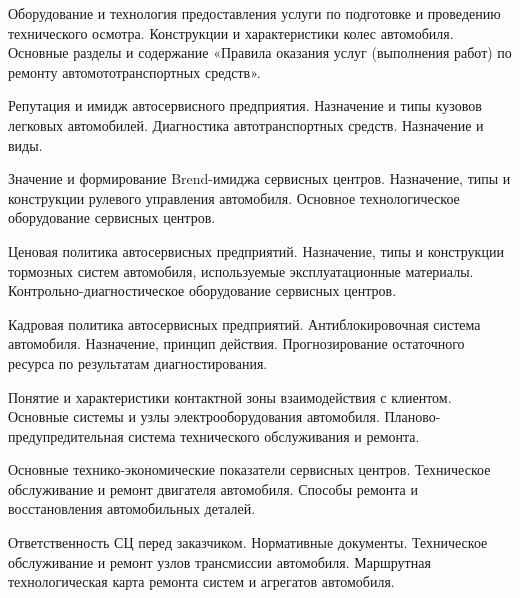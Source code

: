 \documentclass[
	11pt,
	a4paper,
	]
	{article}
\begin{document}
\bigskip

\noindent{} 
	{
		Оборудование и технология предоставления услуги по подготовке и проведению технического осмотра.
	}{
		Конструкции и характеристики колес автомобиля.
	}{
		Основные разделы и содержание «Правила оказания услуг (выполнения работ) по ремонту автомототранспортных средств».
	}

\bigskip

\noindent{} 
	{
		Репутация и имидж автосервисного предприятия.
	}{
		Назначение и типы кузовов легковых автомобилей.
	}{
		Диагностика автотранспортных средств. Назначение и виды.
	}

\bigskip

\noindent{} 
	{
		Значение и формирование Brend-имиджа сервисных центров.
	}{
		Назначение, типы и конструкции рулевого управления автомобиля.
	}{
		Основное технологическое оборудование сервисных центров.
	}

\bigskip

\noindent{} 
	{
		Ценовая политика автосервисных предприятий.
	}{
		Назначение, типы и конструкции тормозных систем автомобиля, используемые эксплуатационные материалы.
	}{
		Контрольно-диагностическое оборудование сервисных центров.
	}

\bigskip

\noindent{} 
	{
		Кадровая политика автосервисных предприятий.
	}{
		Антиблокировочная система автомобиля. Назначение, принцип действия.
	}{
		Прогнозирование остаточного ресурса по результатам диагностирования.
	}

\bigskip

\noindent{} 
	{
		Понятие и характеристики контактной зоны взаимодействия с клиентом.
	}{
		Основные системы и узлы электрооборудования автомобиля.
	}{
		Планово-предупредительная система технического обслуживания и ремонта.
	}

\bigskip

\noindent{} 
	{
		Основные технико-экономические показатели сервисных центров.
	}{
		Техническое обслуживание и ремонт двигателя автомобиля.
	}{
		Способы ремонта и восстановления автомобильных деталей.
	}

\bigskip

\noindent{} 
	{
		Ответственность СЦ перед заказчиком. Нормативные документы.
	}{
		Техническое обслуживание и ремонт узлов трансмиссии автомобиля.
	}{
		Маршрутная технологическая карта ремонта систем и агрегатов автомобиля.
	}
\end{document}
